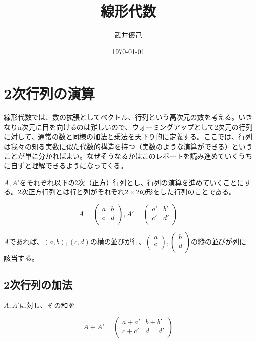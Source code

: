\documentclass[dvipdfmx,autodetect-engine]{jsarticle}
\title{線形代数}
\author{武井優己}
\date{\today}
\begin{document}
\maketitle

\section{2次行列の演算}

線形代数では、数の拡張としてベクトル、行列という高次元の数を考える。いきなりn次元に目を向けるのは難しいので、ウォーミングアップとして2次元の行列に対して、通常の数と同様の加法と乗法を天下り的に定義する。ここでは、行列は我々の知る実数に似た代数的構造を持つ（実数のような演算ができる）ということが単に分かればよい。なぜそうなるかはこのレポートを読み進めていくうちに自ずと理解できるようになってくる。

$A, A'$をそれぞれ以下の2次（正方）行列とし、行列の演算を進めていくことにする。2次正方行列とは行と列がそれぞれ$2 \times 2$の形をした行列のことである。

$$
A = \begin{pmatrix}
a & b \\
c & d \\
\end{pmatrix},
A' = \begin{pmatrix}
a' & b' \\
c' & d' \\
\end{pmatrix}
$$

$A$であれば、$(a, b), (c, d)$の横の並びが行、$\begin{pmatrix}
a \\
c \\
\end{pmatrix}, \begin{pmatrix}
b \\
d \\
\end{pmatrix}$の縦の並びが列に該当する。


\subsection{2次行列の加法}

$A, A'$に対し、その和を

$$
A + A' = \begin{pmatrix}
a + a' & b + b' \\
c + c' & d = d'\\
\end{pmatrix}
$$
\end{document}
